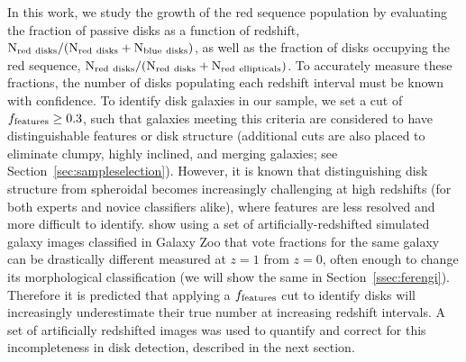 \documentclass[useAMS,usenatbib]{mn2e}
\begin{document}
In this work, we study the growth of the red sequence population by evaluating the fraction of passive disks as a function of redshift, $\rm N_{red~disks}/(N_{red~disks}+N_{blue~disks})$, as well as the fraction of disks occupying the red sequence, $\rm N_{red~disks}/(N_{red~disks}+N_{red~ellipticals})$. To accurately measure these fractions, the number of disks populating each redshift interval must be known with confidence. To identify disk galaxies in our sample, we set a cut of $f_{\rm features}\ge0.3$, such that galaxies meeting this criteria are considered to have distinguishable features or disk structure (additional cuts are also placed to eliminate clumpy, highly inclined, and merging galaxies; see Section~\ref{sec:sampleselection}). However, it is known that distinguishing disk structure from spheroidal becomes increasingly challenging at high redshifts (for both experts and novice classifiers alike), where features are less resolved and more difficult to identify. \citet{Willett2016} show using a set of artificially-redshifted simulated galaxy images classified in Galaxy Zoo that vote fractions for the same galaxy can be drastically different measured at $z=1$ from $z=0$, often enough to change its morphological classification (we will show the same in Section~\ref{ssec:ferengi}).  Therefore it is predicted that applying a $f_{\rm features}$ cut to identify disks will increasingly underestimate their true number at increasing redshift intervals. A set of artificially redshifted images was used to quantify and correct for this incompleteness in disk detection, described in the next section.
 
\end{document}
